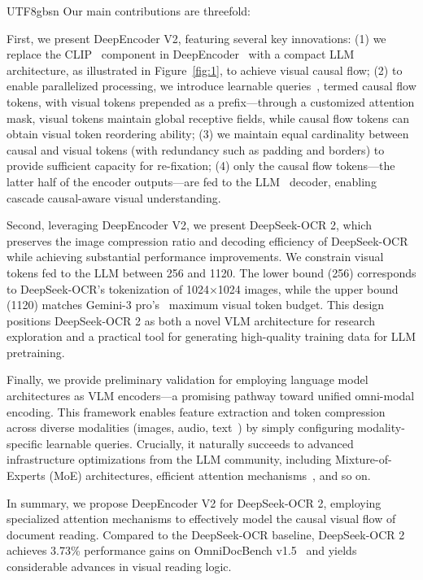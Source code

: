 \documentclass[11pt, a4paper, logo, copyright, nonumbering]{deepseek}
\begin{document}
\begin{CJK*}{UTF8}{gbsn}
Our main contributions are threefold:


First, we present DeepEncoder V2, featuring several key innovations: (1) we replace the CLIP~\cite{radford2021learning} component in DeepEncoder~\cite{wei2025deepseek} with a compact LLM~\cite{wang2024qwen2} architecture, as illustrated in Figure~\ref{fig:1}, to achieve visual causal flow; (2) to enable parallelized processing, we introduce learnable queries~\cite{carion2020end}, termed causal flow tokens, with visual tokens prepended as a prefix—through a customized attention mask, visual tokens maintain global receptive fields, while causal flow tokens can obtain visual token reordering ability; (3) we maintain equal cardinality between causal and visual tokens (with redundancy such as padding and borders) to provide sufficient capacity for re-fixation; (4) only the causal flow tokens—the latter half of the encoder outputs—are fed to the LLM~\cite{deepseekv2} decoder, enabling cascade causal-aware visual understanding.


Second, leveraging DeepEncoder V2, we present DeepSeek-OCR 2, which preserves the image compression ratio and decoding efficiency of DeepSeek-OCR while achieving substantial performance improvements. We constrain visual tokens fed to the LLM between 256 and 1120. The lower bound (256) corresponds to DeepSeek-OCR's tokenization of 1024×1024 images, while the upper bound (1120) matches Gemini-3 pro's~\cite{team2023gemini} maximum visual token budget. This design positions DeepSeek-OCR 2 as both a novel VLM architecture for research exploration and a practical tool for generating high-quality training data for LLM pretraining.


Finally, we provide preliminary validation for employing language model architectures as VLM encoders—a promising pathway toward unified omni-modal encoding. This framework enables feature extraction and token compression across diverse modalities (images, audio, text~\cite{liu2025context}) by simply configuring modality-specific learnable queries. Crucially, it naturally succeeds to advanced infrastructure optimizations from the LLM community, including Mixture-of-Experts (MoE) architectures, efficient attention mechanisms~\cite{deepseek32}, and so on.

In summary, we propose DeepEncoder V2 for DeepSeek-OCR 2, employing specialized attention mechanisms to effectively model the causal visual flow of document reading. Compared to the DeepSeek-OCR baseline, DeepSeek-OCR 2 achieves 3.73\% performance gains on OmniDocBench v1.5~\cite{ouyang2025omnidocbench} and yields considerable advances in visual reading logic. 





\end{CJK*}
\end{document}
